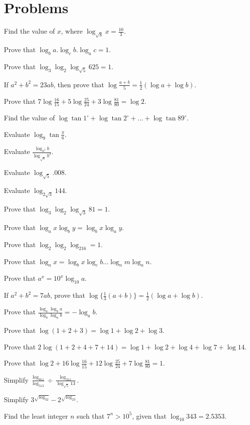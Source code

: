 \section{Problems}
\startitemize[n]
\item Find the value of $x$, where $\log_{\sqrt{8}} x = \frac{10}{3}$.
\item Prove that $\log_ba.\log_cb.\log_ac = 1$.
\item Prove that $\log_3\log_2\log_{\sqrt{5}}625 = 1$.
\item If $a^2 + b^2 = 23ab$, then prove that $\log\frac{a + b}{5} = \frac{1}{2}(\log a + \log b)$.
\item Prove that $7\log\frac{16}{15} + 5\log\frac{25}{24} + 3\log\frac{81}{80} = \log 2$.
\item Find the value of $\log\tan1^\circ + \log\tan2^\circ + \ldots + \log\tan89^\circ$.
\item Evaluate $\log_9\tan\frac{\pi}{6}$.
\item Evaluate $\frac{\log_{a^2}b}{\log_{\sqrt{a}}b^2}$.
\item Evaluate $\log_{\sqrt{5}}.008$.
\item Evaluate $\log_{2\sqrt{3}}144$.
\item Prove that $\log_3\log_2\log_{\sqrt{3}}81 = 1$.
\item Prove that $\log_ax\log_by = \log_bx\log_ay$.
\item Prove that $\log_2\log_2\log_216 = 1$.
\item Prove that $\log_ax = \log_bx\log_cb\ldots\log_nm\log_an$.
\item Prove that $a^x = 10^x\log_{10}a$.
\item If $a^2 + b^2 = 7ab$, prove that $\log\{\frac{1}{3}(a + b)\} = \frac{1}{2}(\log a + \log b)$.
\item Prove that $\frac{\log_a\log_ba}{\log_b\log_ab} = -\log_ab$.
\item Prove that $\log(1 + 2 + 3) = \log 1 + \log 2 + \log 3$.
\item Prove that $2\log(1 + 2 + 4 + 7 + 14) = \log 1 + \log 2 + \log 4 + \log 7 + \log 14$.
\item Prove that $\log 2 + 16\log\frac{16}{15} + 12\log\frac{25}{24} + 7\log\frac{81}{80} = 1$.
\item Simplify $\frac{\log_911}{\log_513}\div\frac{\log_311}{\log_{\sqrt{5}}13}$.
\item Simplify $3^{\sqrt{\log_32}} - 2^{\sqrt{\log_23}}$.
\item Find the least integer $n$ such that $7^n > 10^5$, given that $\log_{10}343 = 2.5353$.
